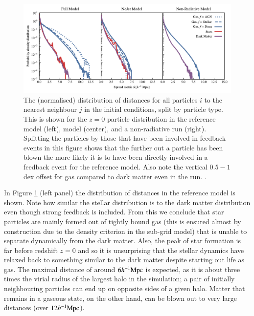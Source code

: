 \begin{figure}
    \centering
    \includegraphics[width=\textwidth]{figures/neighbour_analysis_feedback_histogram_combined.pdf}
    \vspace{-0.7cm}
    \caption{
        The (normalised) distribution of distances for all particles $i$ to
        the nearest neighbour $j$ in the initial conditions, split by particle
        type. This is shown for the $z=0$ particle distribution in the
        reference model (left), \nojet{} model (center), and a non-radiative
        run (right). Splitting the particles by those that have been
        involved in feedback events in this figure shows that the further
        out a particle has been blown the more likely it is to have been
        directly involved in a feedback event for the reference model. Also note
        the vertical $0.5-1$ dex offset for gas compared to dark matter even in
        the \nojet{} run. .
    }\label{fig:feedbackdistance}
\end{figure}

In Figure \ref{fig:feedbackdistance} (left panel) the distribution of
distances in the reference model is shown. Note how similar the stellar
distribution is to the dark matter distribution even though strong feedback
is included. From this we conclude that star particles are mainly formed out
of tightly bound gas (this is ensured almost by construction due to the
density criterion in the sub-grid model) that is unable to separate
dynamically from the dark matter. Also, the peak of star formation is far
before redshift $z=0$ and so it is unsurprising that the stellar dynamics
have relaxed back to something similar to the dark matter despite starting
out life as gas. The maximal distance of around $6h^{-1}{\rm Mpc}{}$ is expected, as it
is about three times the virial radius of the largest halo in the simulation;
a pair of initially neighbouring particles can end up on opposite sides of a
given halo. Matter that remains in a gaseous state, on the other hand, can be
blown out to very large distances (over $12 h^{-1}{\rm Mpc}{}$).

